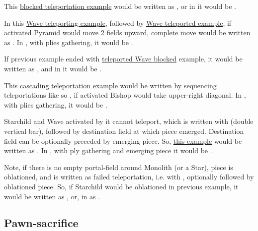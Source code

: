 This \hyperref[fig:scn_n_03_teleport_move_2]{blocked teleportation example} would be
written as , or in  it would be .

In this \hyperref[fig:scn_n_04_teleport_move_3]{Wave teleporting example}, followed by
\hyperref[fig:scn_n_05_teleport_end]{Wave teleported example}, if activated Pyramid
would move 2 fields upward, complete move would be written as \newline
{}. In , with plies gathering, it would be \newline
\alg{[Ei11-g15]\~{}[Wg15-a18]|[Wr1-l4]\~{}[Al4-l6]}.

If previous example ended with
\hyperref[fig:scn_n_06_teleport_wave_blocked]{teleported Wave blocked} example,
it would be written as , and in  it would be
.

This \hyperref[fig:scn_d_18_teleporting_wave_cascade]{cascading teleportation example}
would be written by sequencing teleportations like so ,
if activated Bishop would take upper-right diagonal. In , with plies
gathering, it would be \newline
\alg{[Ej6-h2]\~{}[Wh2-b4]|[Wm18-a24]|[Wx1-r4]\~{}} \newline
\alg{[Br4-t6]}.

Starchild and Wave activated by it cannot teleport, which is written with \alg{||}
(double vertical bar), followed by destination field at which piece emerged. Destination
field can be optionally preceded by emerging piece. So,
\hyperref[fig:scn_o_07_starchild_not_moving_monolith_init]{this example} would be
written as . In , with ply gathering and emerging piece
it would be .

Note, if there is no empty portal-field around Monolith (or a Star), piece is oblationed,
and is written as failed teleportation, i.e. with \alg{|||}, optionally followed by
oblationed piece. So, if Starchild would be oblationed in previous example, it would
be written as , or, in  as .

\subsection*{Pawn-sacrifice}
\label{sec:Appendix/Notation/Pawn-sacrifice}

